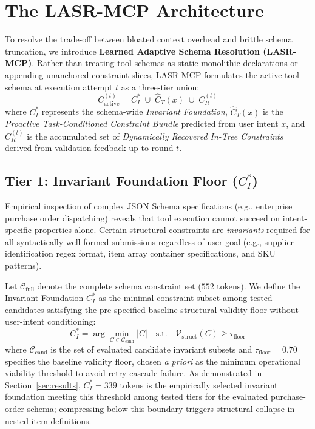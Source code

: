 \section{The LASR-MCP Architecture}
\label{sec:architecture}



To resolve the trade-off between bloated context overhead and brittle schema truncation, we introduce \textbf{Learned Adaptive Schema Resolution (LASR-MCP)}. Rather than treating tool schemas as static monolithic declarations or appending unanchored constraint slices, LASR-MCP formulates the active tool schema at execution attempt $t$ as a three-tier union:
\begin{equation}
\label{eq:three_tier}
C_{\text{active}}^{(t)} = C_I^* \;\cup\; \hat{C}_T(x) \;\cup\; C_R^{(t)}
\end{equation}
where $C_I^*$ represents the schema-wide \textit{Invariant Foundation}, $\hat{C}_T(x)$ is the \textit{Proactive Task-Conditioned Constraint Bundle} predicted from user intent $x$, and $C_R^{(t)}$ is the accumulated set of \textit{Dynamically Recovered In-Tree Constraints} derived from validation feedback up to round $t$.

\subsection{Tier 1: Invariant Foundation Floor ($C_I^*$)}
Empirical inspection of complex JSON Schema specifications (e.g., enterprise purchase order dispatching) reveals that tool execution cannot succeed on intent-specific properties alone. Certain structural constraints are \textit{invariants} required for all syntactically well-formed submissions regardless of user goal (e.g., supplier identification regex format, item array container specifications, and SKU patterns).

Let $\mathcal{C}_{\text{full}}$ denote the complete schema constraint set ($552$ tokens). We define the Invariant Foundation $C_I^*$ as the minimal constraint subset among tested candidates satisfying the pre-specified baseline structural-validity floor without user-intent conditioning:
\begin{equation}
C_I^* = \arg\min_{C \in \mathcal{C}_{\text{cand}}} |C| \quad \text{s.t.} \quad \mathcal{V}_{\text{struct}}(C) \ge \tau_{\text{floor}}
\end{equation}
where $\mathcal{C}_{\text{cand}}$ is the set of evaluated candidate invariant subsets and $\tau_{\text{floor}} = 0.70$ specifies the baseline validity floor, chosen \textit{a priori} as the minimum operational viability threshold to avoid retry cascade failure. As demonstrated in Section~\ref{sec:results}, $C_I^* = 339$ tokens is the empirically selected invariant foundation meeting this threshold among tested tiers for the evaluated purchase-order schema; compressing below this boundary triggers structural collapse in nested item definitions.


